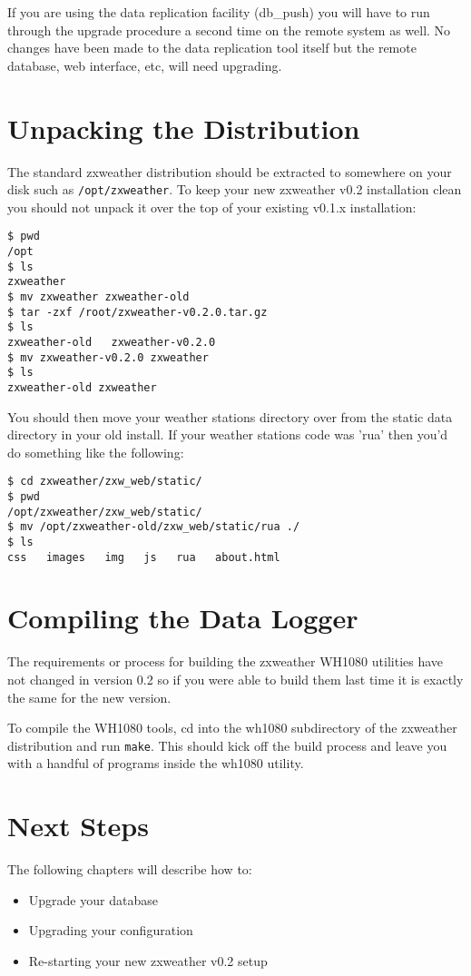 \documentclass[a4paper,10pt,draft]{book}
\begin{document}
If you are using the data replication facility (db\_push) you will have to run through the upgrade procedure a second time on the remote system as well. No changes have been made to the data replication tool itself but the remote database, web interface, etc, will need upgrading.

\section{Unpacking the Distribution}
\label{sec_unpack}
The standard zxweather distribution should be extracted to somewhere on your disk such as \verb|/opt/zxweather|. To keep your new zxweather v0.2 installation clean you should not unpack it over the top of your existing v0.1.x installation:

\begin{verbatim}
$ pwd
/opt
$ ls
zxweather
$ mv zxweather zxweather-old
$ tar -zxf /root/zxweather-v0.2.0.tar.gz
$ ls
zxweather-old   zxweather-v0.2.0
$ mv zxweather-v0.2.0 zxweather
$ ls
zxweather-old zxweather
\end{verbatim}

You should then move your weather stations directory over from the static data directory in your old install. If your weather stations code was 'rua' then you'd do something like the following:
\begin{verbatim}
$ cd zxweather/zxw_web/static/
$ pwd
/opt/zxweather/zxw_web/static/
$ mv /opt/zxweather-old/zxw_web/static/rua ./
$ ls
css   images   img   js   rua   about.html
\end{verbatim}

\section{Compiling the Data Logger}
The requirements or process for building the zxweather WH1080 utilities have not changed in version 0.2 so if you were able to build them last time it is exactly the same for the new version.

To compile the WH1080 tools, cd into the wh1080 subdirectory of the zxweather distribution and run \verb|make|. This should kick off the build process and leave you with a handful of programs inside the wh1080 utility.

\section{Next Steps}
The following chapters will describe how to:
\begin{itemize}
\item Upgrade your database
\item Upgrading your configuration
\item Re-starting your new zxweather v0.2 setup
\end{itemize}
\end{document}
